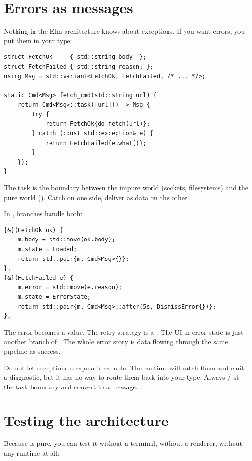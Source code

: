 \section{Errors as messages}

Nothing in the Elm architecture knows about exceptions. If you
want errors, you put them in your  type:

\begin{lstlisting}
struct FetchOk     { std::string body; };
struct FetchFailed { std::string reason; };
using Msg = std::variant<FetchOk, FetchFailed, /* ... */>;

static Cmd<Msg> fetch_cmd(std::string url) {
    return Cmd<Msg>::task([url]() -> Msg {
        try {
            return FetchOk{do_fetch(url)};
        } catch (const std::exception& e) {
            return FetchFailed{e.what()};
        }
    });
}
\end{lstlisting}

The task is the boundary between the impure world (sockets,
filesystems) and the pure world (). Catch on one
side, deliver as data on the other.

In , branches handle both:

\begin{lstlisting}
[&](FetchOk ok) {
    m.body = std::move(ok.body);
    m.state = Loaded;
    return std::pair{m, Cmd<Msg>{}};
},
[&](FetchFailed e) {
    m.error = std::move(e.reason);
    m.state = ErrorState;
    return std::pair{m, Cmd<Msg>::after(5s, DismissError{})};
},
\end{lstlisting}

The error becomes a value. The retry strategy is a .
The UI in error state is just another branch of . The
whole error story is data flowing through the same pipeline as
success.

\begin{warning}
Do not let exceptions escape a 's callable. The runtime
will catch them and emit a diagnostic, but it has no way to route
them back into your  type. Always /
at the task boundary and convert to a message.
\end{warning}

\section{Testing the architecture}

Because  is pure, you can test it without a terminal,
without a renderer, without any runtime at all:

